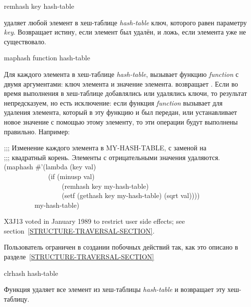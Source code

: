\begin{defun}[Функция]
remhash key hash-table

 удаляет любой элемент в хеш-таблице \emph{hash-table} ключ,
которого равен параметру \emph{key}. Возвращает истину, если элемент был
удалён, и ложь, если элемента уже не существовало.
\end{defun}

\begin{defun}[Функция]
maphash function hash-table

Для каждого элемента в хеш-таблице \emph{hash-table},  вызывает
функцию \emph{function} с двумя аргументами:
ключ элемента и
значение элемента.
 возвращает .
Если во время выполнения  в хеш-таблице добавлялись или удалялись
ключи, то результат непредсказуем, но есть исключение:
если функция \emph{function} вызывает  для удаления элемента,
который в эту функцию и был передан, или устанавливает новое значение с помощью
 этому элементу, то эти операции будут выполнены правильно.
Например:
\begin{lisp}
;;; Изменение каждого элемента в MY-HASH-TABLE, с заменой на \\
;;; квадратный корень. Элементы с отрицательными значения удаляются. \\
(maphash \#'(lambda (key val) \\
~~~~~~~~~~~~~(if (minusp val) \\
~~~~~~~~~~~~~~~~~(remhash key my-hash-table) \\
~~~~~~~~~~~~~~~~~(setf (gethash key my-hash-table) (sqrt val)))) \\
~~~~~~~~~my-hash-table)
\end{lisp}

\begin{new}
X3J13 voted in January 1989
to restrict user side effects; see section~\ref{STRUCTURE-TRAVERSAL-SECTION}.
\end{new}

Пользователь ограничен в создании побочных действий так, как это описано в
разделе~\ref{STRUCTURE-TRAVERSAL-SECTION}
\end{defun}

\begin{defun}[Функция]
clrhash hash-table

Функция удаляет все элемент из хеш-таблицы \emph{hash-table} и возвращает эту
хеш-таблицу.
\end{defun}

